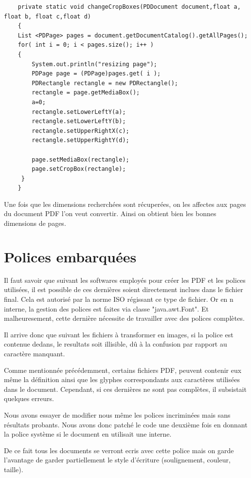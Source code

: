 
    \lstset{language=Java}
    \begin{lstlisting} 
    private static void changeCropBoxes(PDDocument document,float a, float b, float c,float d)
    {
	List <PDPage> pages = document.getDocumentCatalog().getAllPages();
	for( int i = 0; i < pages.size(); i++ )
	{
        System.out.println("resizing page");
        PDPage page = (PDPage)pages.get( i );
        PDRectangle rectangle = new PDRectangle();
        rectangle = page.getMediaBox();
        a=0;
        rectangle.setLowerLeftY(a);
        rectangle.setLowerLeftY(b);
        rectangle.setUpperRightX(c);
        rectangle.setUpperRightY(d);

        page.setMediaBox(rectangle);
        page.setCropBox(rectangle);
	 }
    }
    \end{lstlisting}

        Une fois que les dimensions recherchées sont récuperées, on les affectes
    aux pages du document PDF l'on veut convertir. Ainsi on obtient bien les bonnes 
    dimensions de pages.



    \section{Polices embarquées}
        Il faut savoir que suivant les softwares employés pour créer les PDF et
    les polices utilisées, il est possible de ces dernières soient directement
    inclues dans le fichier final. Cela est autorisé par la norme ISO régissant 
    ce type de fichier. Or en n interne, la gestion des polices est faites via 
    classe "java.awt.Font". Et malheuresement, cette dernière nécessite de travailler
    avec des polices complètes.

        Il arrive donc que suivant les fichiers à transformer en images, si la police 
    est contenue dedans, le resultats soit illisible, dû à la confusion par rapport
    au caractère manquant.


        Comme mentionnée précédemment, certains fichiers PDF, peuvent contenir eux 
    même la définition ainsi que les glyphes correspondants aux caractères utilisées dans 
    le document. Cependant, si ces dernières ne sont pas complètes, il subsistait
    quelques erreurs.

        Nous avons essayer de modifier nous même les polices incriminées mais 
    sans résultats probants. Nous avons donc patché le code une deuxième fois 
    en donnant la police système si le document en utilisait une interne.

        De ce fait tous les documents se verront ecris avec cette police mais 
    on garde l'avantage de garder partiellement le style d'écriture 
    (soulignement, couleur, taille).








